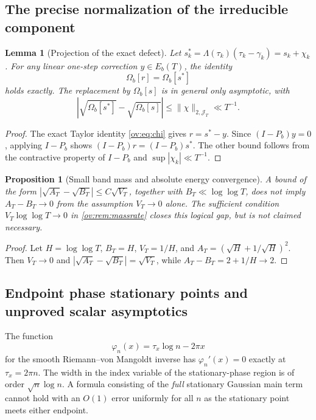 \documentclass[11pt,reqno]{amsart}
\numberwithin{equation}{section}
\newtheorem{proposition}[theorem]{Proposition}
\newtheorem{lemma}[theorem]{Lemma}
\newcommand{\lamb}{\Lambda}
\begin{document}
\subsection{The precise normalization of the irreducible component}
\begin{lemma}[Projection of the exact defect]
\label{lem:exactOmegaChi}
Let $s_k^*=\lamb(\tau_k)(\tau_k-\gamma_k)=s_k+\chi_k$.
For any linear one-step correction $y\in E_b(T)$, the identity
\begin{equation}\label{eq:exactOmegaChi}
\Omega_b[r]=\Omega_b[s^*]
\end{equation}
holds exactly. The replacement by $\Omega_b[s]$ is in general
only asymptotic, with
\begin{equation}\label{eq:chiOmegabound}
\left|\sqrt{\Omega_b[s^*]}-\sqrt{\Omega_b[s]}\right|
\le\|\chi\|_{2,\mathcal J_T}\ll T^{-1}.
\end{equation}
\end{lemma}
\begin{proof}
The exact Taylor identity \eqref{ov:eq:chi} gives $r=s^*-y$.
Since $(I-P_b)y=0$, applying $I-P_b$ shows
$(I-P_b)r=(I-P_b)s^*$. The other bound follows from the
contractive property of $I-P_b$ and $\sup|\chi_k|\ll T^{-1}$.
\end{proof}

\begin{proposition}[Small band mass and absolute energy convergence]
\label{prop:massnecessitylogic}
A bound of the form
$|\sqrt{A_T}-\sqrt{B_T}|\le C\sqrt{V_T}$, together with
$B_T\ll\log\log T$, does \emph{not} imply $A_T-B_T\to0$
from the assumption $V_T\to0$ alone. The sufficient condition
$V_T\log\log T\to0$ in \cref{ov:rem:massrate} closes this
logical gap, but is not claimed necessary.
\end{proposition}
\begin{proof}
Let $H=\log\log T$, $B_T=H$, $V_T=1/H$, and
$A_T=(\sqrt H+1/\sqrt H)^2$. Then $V_T\to0$ and
$|\sqrt{A_T}-\sqrt{B_T}|=\sqrt{V_T}$, while
$A_T-B_T=2+1/H\to2$.
\end{proof}

\subsection{Endpoint phase stationary points and unproved scalar asymptotics}
The function
\[
\varphi_n(x)=\tau_x\log n-2\pi x
\]
for the smooth Riemann--von Mangoldt inverse has
$\varphi_n'(x)=0$ exactly at $\tau_x=2\pi n$.
The width in the index variable of the stationary-phase region is
of order $\sqrt n\log n$. A formula consisting of the \emph{full}
stationary Gaussian main term cannot hold with an $O(1)$ error
uniformly for all $n$ as the stationary point meets either endpoint.
\end{document}
